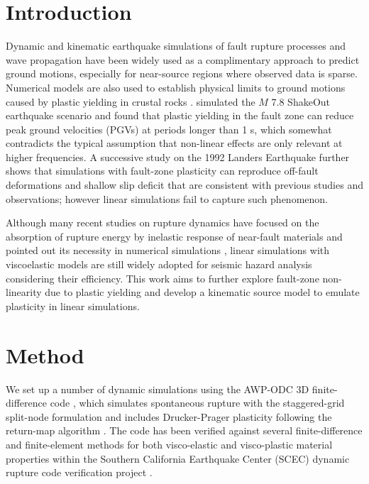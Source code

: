 \section{Introduction} \label{eks:intro}
Dynamic and kinematic earthquake simulations of fault rupture processes and wave propagation have been widely used as a complimentary approach to predict ground motions, especially for near-source regions where observed data is sparse. Numerical models are also used to establish physical limits to ground motions caused by plastic yielding in crustal rocks . \citet{rotenExpectedSeismicShaking2014} simulated the $M$ 7.8 ShakeOut earthquake scenario and found that plastic yielding in the fault zone can reduce peak ground velocities (PGVs) at periods longer than 1 s, which somewhat contradicts the typical assumption that non-linear effects are only relevant at higher frequencies. A successive study \citep{rotenOfffaultDeformationsShallow2017} on the 1992 Landers Earthquake further shows that simulations with fault-zone plasticity can reproduce off-fault deformations and shallow slip deficit that are consistent with previous studies and observations; however linear simulations fail to capture such phenomenon.

Although many recent studies on rupture dynamics have focused on the absorption of rupture energy by inelastic response of near-fault materials and pointed out its necessity in numerical simulations , linear simulations with viscoelastic models are still widely adopted for seismic hazard analysis considering their efficiency. This work aims to further explore fault-zone non-linearity due to plastic yielding and develop a kinematic source model to emulate plasticity in linear simulations.



\section{Method}\label{eks:method}
We set up a number of dynamic simulations using the AWP-ODC 3D finite-difference code \citep{olsenThreeDimensionalSimulationMagnitude1995,dayMemoryEfficientSimulationAnelastic2001,cuiScalableEarthquakeSimulation2010}, which simulates spontaneous rupture with the staggered-grid split-node formulation \citep{dalguer2007staggered} and includes Drucker-Prager plasticity following the return-map algorithm \citep{rotenOfffaultDeformationsShallow2017}. The code has been verified against several finite-difference and finite-element methods for both visco-elastic and visco-plastic material properties within the Southern California Earthquake Center (SCEC) dynamic rupture code verification project \citep{harris2009scec,harris2011verifying}.

